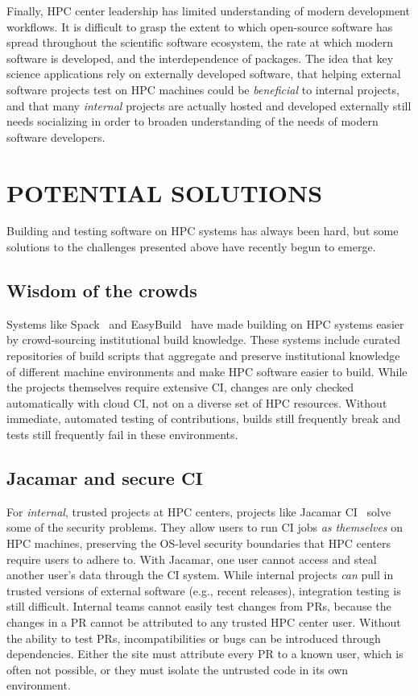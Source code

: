 \documentclass{IEEEcsmag}
\begin{document}
Finally, HPC center leadership has limited understanding of modern development workflows.
It is difficult to grasp the extent to which open-source software has spread
throughout the scientific software ecosystem, the rate at which modern software is
developed, and the interdependence of packages. The idea that key science applications
rely on externally developed software, that helping external software projects test on
HPC machines could be {\it beneficial} to internal projects, and that many {\it
  internal} projects are actually hosted and developed externally still needs
socializing in order to broaden understanding of the needs of modern software
developers.

\section{POTENTIAL SOLUTIONS}

Building and testing software on HPC systems has always been hard, but some solutions
to the challenges presented above have recently begun to emerge.

\subsection{Wisdom of the crowds}

Systems like Spack~\cite{gamblin+:sc15} and EasyBuild~\cite{hoste+:pyhpc12} have made
building on HPC systems easier by crowd-sourcing institutional build knowledge. These
systems include curated repositories of build scripts that aggregate and preserve
institutional knowledge of different machine environments and make HPC software easier
to build. While the projects themselves require extensive CI, changes are only checked
automatically with cloud CI, not on a diverse set of HPC resources. Without immediate,
automated testing of contributions, builds still frequently break and tests still frequently
fail in these environments.


\subsection{Jacamar and secure CI}

For {\it internal}, trusted projects at HPC centers, projects like Jacamar CI~\cite{jacamar-ci}
solve some of the security problems. They allow users to run CI jobs {\it as themselves} on HPC
machines, preserving the OS-level security boundaries that HPC centers require users to
adhere to. With Jacamar, one user cannot access and steal another user's data through the CI
system.
While internal projects {\it can} pull in trusted versions of external
software (e.g., recent releases), integration testing is still difficult. Internal
teams cannot easily test changes from PRs, because the changes in a PR cannot be
attributed to any trusted HPC center user. Without the ability to test PRs, incompatibilities
or bugs can be introduced through dependencies. Either the site must attribute every
PR to a known user, which is often not possible, or they must isolate the untrusted code
in its own environment.
\end{document}
